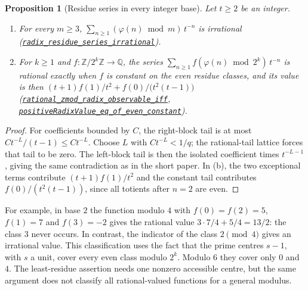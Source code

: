 \documentclass[11pt]{article}
\theoremstyle{plain}
\newtheorem{prop}[thm]{Proposition}
\theoremstyle{definition}
\theoremstyle{remark}
\newcommand{\Z}{\mathbb{Z}}
\newcommand{\Q}{\mathbb{Q}}
\begin{document}
\begin{prop}[Residue series in every integer base]
\label{prop:radixresidue}
Let $t\ge2$ be an integer.
\begin{enumerate}[label=(\alph*),leftmargin=*]
\item For every $m\ge3$, $\sum_{n\ge1}(\varphi(n)\bmod m)\,t^{-n}$ is
  irrational
  (\href{https://github.com/wcook04/plectis-erdos/blob/24edbddbe2bd68e920327a701aad0b9dd0d69675/lean/ErdosProblems/Erdos249/PaperCompleteR7/RationalIntegerRadixClassification.lean\#L128}{\texttt{radix\_residue\_series\_irrational}}).
\item For $k\ge1$ and $f:\Z/2^k\Z\to\Q$, the series
  $\sum_{n\ge1}f(\varphi(n)\bmod2^k)\,t^{-n}$ is rational exactly when $f$
  is constant on the even residue classes, and its value is then
  $(t+1)f(1)/t^2+f(0)/\bigl(t^2(t-1)\bigr)$
  (\href{https://github.com/wcook04/plectis-erdos/blob/24edbddbe2bd68e920327a701aad0b9dd0d69675/lean/ErdosProblems/Erdos249/PaperCompleteR7/RationalIntegerRadixClassification.lean\#L145}{\texttt{rational\_zmod\_radix\_observable\_iff}},
  \href{https://github.com/wcook04/plectis-erdos/blob/24edbddbe2bd68e920327a701aad0b9dd0d69675/lean/ErdosProblems/Erdos249/PaperCompleteR7/IntegerRadixObservables.lean\#L303}{\texttt{positiveRadixValue\_eq\_of\_even\_constant}}).
\end{enumerate}
\end{prop}

\begin{proof}
For coefficients bounded by $C$, the right-block tail is at most
$Ct^{-L}/(t-1)\le Ct^{-L}$. Choose $L$ with $Ct^{-L}<1/q$;
the rational-tail lattice forces that tail to be zero. The left-block
tail is then the isolated coefficient times $t^{-L-1}$, giving the
same contradiction as in the short paper. In (b), the two exceptional
terms contribute $(t+1)f(1)/t^2$ and the constant tail contributes
$f(0)/(t^2(t-1))$, since all totients after $n=2$ are even.
\end{proof}
For example, in base $2$ the function modulo $4$ with
$f(0)=f(2)=5$, $f(1)=7$ and $f(3)=-2$ gives the rational value
$3\cdot7/4+5/4=13/2$: the class $3$ never occurs. In contrast,
the indicator of the class $2\pmod4$ gives an irrational value.
This classification uses the fact that the prime centres $s-1$,
with $s$ a unit, cover every even class modulo $2^k$. Modulo $6$
they cover only $0$ and $4$. The least-residue assertion needs one
nonzero accessible centre, but the same argument does not classify
all rational-valued functions for a general modulus.
\end{document}
